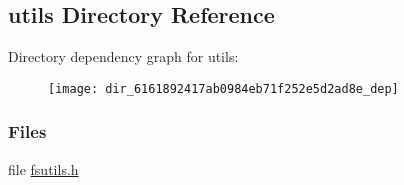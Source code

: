 \subsection{utils Directory Reference}
\label{dir_6161892417ab0984eb71f252e5d2ad8e}
Directory dependency graph for utils\+:
\nopagebreak
\begin{figure}[H]
\begin{center}
\leavevmode
\texttt{[image: dir\_6161892417ab0984eb71f252e5d2ad8e\_dep]}
\end{center}
\end{figure}
\subsubsection*{Files}
\begin{DoxyCompactItemize}
\item 
file \hyperlink{fsutils_8h}{fsutils.\+h}
\end{DoxyCompactItemize}
